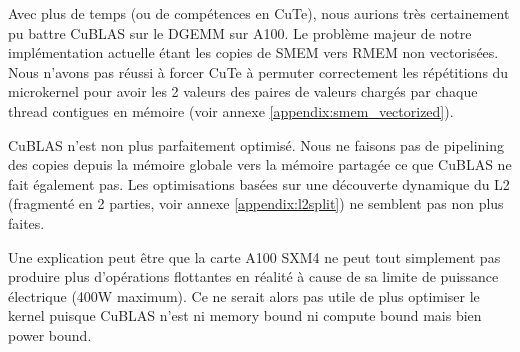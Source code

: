 Avec plus de temps (ou de compétences en CuTe), nous aurions très certainement pu battre CuBLAS sur le DGEMM sur A100.
Le problème majeur de notre implémentation actuelle étant les copies de SMEM vers RMEM non vectorisées.
Nous n'avons pas réussi à forcer CuTe à permuter correctement les répétitions du microkernel pour avoir les 2 valeurs des paires de valeurs chargés par chaque thread contigues en mémoire (voir annexe \ref{appendix:smem_vectorized}).

CuBLAS n'est non plus parfaitement optimisé. Nous ne faisons pas de pipelining des copies depuis la mémoire globale vers la mémoire partagée ce que CuBLAS ne fait également pas.
Les optimisations basées sur une découverte dynamique du L2 (fragmenté en 2 parties, voir annexe \ref{appendix:l2split}) ne semblent pas non plus faites.

Une explication peut être que la carte A100 SXM4 ne peut tout simplement pas produire plus d'opérations flottantes en réalité à cause de sa limite de puissance électrique (400W maximum).
Ce ne serait alors pas utile de plus optimiser le kernel puisque CuBLAS n'est ni memory bound ni compute bound mais bien power bound.
